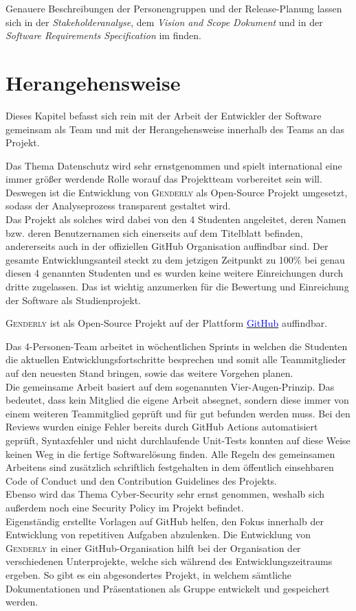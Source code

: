 \documentclass[paper=a4, parskip=half]{scrreprt}
\newcommand{\Genderly}{\textsc{Genderly }}
\begin{document}
Genauere Beschreibungen der Personengruppen und der Release-Planung lassen sich in der \textit{Stakeholderanalyse}, dem \textit{Vision and Scope Dokument} und in der \textit{Software Requirements Specification} im \textcolor{blue}{} finden.


\chapter{Herangehensweise}

Dieses Kapitel befasst sich rein mit der Arbeit der Entwickler der Software gemeinsam als Team und mit der Herangehensweise innerhalb des Teams an das Projekt.

Das Thema Datenschutz wird sehr ernstgenommen und spielt international eine immer größer werdende Rolle worauf das Projektteam vorbereitet sein will. Deswegen ist die Entwicklung von \Genderly als Open-Source Projekt umgesetzt, sodass der Analyseprozess transparent gestaltet wird. \\
Das Projekt als solches wird dabei von den 4 Studenten angeleitet, deren Namen bzw. deren Benutzernamen sich einerseits auf dem Titelblatt befinden, andererseits auch in der offiziellen GitHub Organisation auffindbar sind.
Der gesamte Entwicklungsanteil steckt zu dem jetzigen Zeitpunkt zu 100\% bei genau diesen 4 genannten Studenten und es wurden keine weitere Einreichungen durch dritte zugelassen. Das ist wichtig anzumerken für die Bewertung und Einreichung der Software als Studienprojekt.

\Genderly ist als Open-Source Projekt auf der Plattform \href{https://github.com/HWR-Berlin-SWE-I-Gruppe-2-Team-3-2021/Genderly}{\textcolor{blue}{GitHub}} auffindbar.

Das 4-Personen-Team arbeitet in wöchentlichen Sprints in welchen die Studenten die aktuellen Entwicklungsfortschritte besprechen und somit alle Teammitglieder auf den neuesten Stand bringen, sowie das weitere Vorgehen planen. \\
Die gemeinsame Arbeit basiert auf dem sogenannten Vier-Augen-Prinzip. Das bedeutet, dass kein Mitglied die eigene Arbeit absegnet, sondern diese immer von einem weiteren Teammitglied geprüft und für gut befunden werden muss. Bei den Reviews wurden einige Fehler bereits durch GitHub Actions automatisiert geprüft, Syntaxfehler und nicht durchlaufende Unit-Tests konnten auf diese Weise keinen Weg in die fertige Softwarelösung finden. Alle Regeln des gemeinsamen Arbeitens sind zusätzlich schriftlich festgehalten in dem öffentlich einsehbaren Code of Conduct und den Contribution Guidelines des Projekts. \\
Ebenso wird das Thema Cyber-Security sehr ernst genommen, weshalb sich außerdem noch eine Security Policy im Projekt befindet. \\
Eigenständig erstellte Vorlagen auf GitHub helfen, den Fokus innerhalb der Entwicklung von repetitiven Aufgaben abzulenken. Die Entwicklung von \Genderly in einer GitHub-Organisation hilft bei der Organisation der verschiedenen Unterprojekte, welche sich während des Entwicklungszeitraums ergeben. So gibt es ein abgesondertes Projekt, in welchem sämtliche Dokumentationen und Präsentationen als Gruppe entwickelt und gespeichert werden.
\end{document}

